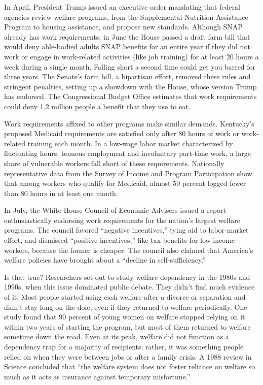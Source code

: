 In April, President Trump issued an executive order mandating that
federal agencies review welfare programs, from the Supplemental
Nutrition Assistance Program to housing assistance, and propose new
standards. Although SNAP already has work requirements, in June the
House passed a draft farm bill that would deny able-bodied adults SNAP
benefits for an entire year if they did not work or engage in
work-related activities (like job training) for at least 20 hours a week
during a single month. Falling short a second time could get you barred
for three years. The Senate's farm bill, a bipartisan effort, removed
these rules and stringent penalties, setting up a showdown with the
House, whose version Trump has endorsed. The Congressional Budget Office
estimates that work requirements could deny 1.2 million people a benefit
that they use to eat.

Work requirements affixed to other programs make similar demands.
Kentucky's proposed Medicaid requirements are satisfied only after 80
hours of work or work-related training each month. In a low-wage labor
market characterized by fluctuating hours, tenuous employment and
involuntary part-time work, a large share of vulnerable workers fall
short of these requirements. Nationally representative data from the
Survey of Income and Program Participation show that among workers who
qualify for Medicaid, almost 50 percent logged fewer than 80 hours in at
least one month.

In July, the White House Council of Economic Advisers issued a report
enthusiastically endorsing work requirements for the nation's largest
welfare programs. The council favored ``negative incentives,'' tying aid
to labor-market effort, and dismissed ``positive incentives,'' like tax
benefits for low-income workers, because the former is cheaper. The
council also claimed that America's welfare policies have brought about
a ``decline in self-sufficiency.''

Is that true? Researchers set out to study welfare dependency in the
1980s and 1990s, when this issue dominated public debate. They didn't
find much evidence of it. Most people started using cash welfare after a
divorce or separation and didn't stay long on the dole, even if they
returned to welfare periodically. One study found that 90 percent of
young women on welfare stopped relying on it within two years of
starting the program, but most of them returned to welfare sometime down
the road. Even at its peak, welfare did not function as a dependency
trap for a majority of recipients; rather, it was something people
relied on when they were between jobs or after a family crisis. A 1988
review in Science concluded that ``the welfare system does not foster
reliance on welfare so much as it acts as insurance against temporary
misfortune.''

